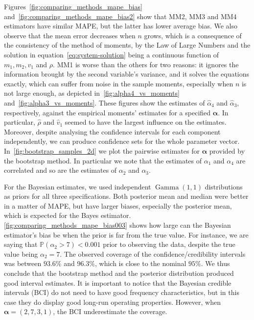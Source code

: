 \documentclass[a4paper, notitlepage, 10pt]{article}
\newcommand{\parameter}{\boldsymbol{\alpha}}
\newcommand{\pr}{\mathbb{P}}
\theoremstyle{definition}
\begin{document}
Figures~\ref{fig:comparing_methods_mape_bias} and~\ref{fig:comparing_methods_mape_bias2} show that MM2, MM3 and MM4 estimators have similar MAPE, but the latter has lower average bias.
We also observe that the mean error decreases when $n$ grows, which is a consequence of the consistency of the method of moments, by the Law of Large Numbers and the solution in equation~\eqref{eq:system-solution} being a continuous function of $m_1, m_2, v_1$ and $\rho$.
MM1 is worse than the others for two reasons: it ignores the information brought by the second variable's variance, and it solves the equations exactly, which can suffer from noise in the sample moments, especially when $n$ is not large enough, as depicted in~\autoref{fig:alpha4_vs_moments} and~\autoref{fig:alpha3_vs_moments}. 
These figures show the estimates of $\hat\alpha_4$ and $\hat\alpha_3$, respectively, against the empirical moments' estimates for a specified $\parameter$. 
In particular, $\hat{\rho}$ and $\hat{v}_1$ seemed to have the largest influence on the estimates.
Moreover, despite analysing the confidence intervals for each component independently, we can produce confidence sets for the whole parameter vector.
In~\autoref{fig:bootstrap_samples_2d} we plot the pairwise estimates for $\parameter$ provided by the bootstrap method.
In particular we note that the estimates of $\alpha_1$ and $\alpha_4$ are correlated and so are the estimates of $\alpha_2$ and $\alpha_3$.

For the Bayesian estimates, we used independent $\operatorname{Gamma}(1,1)$ distributions as priors for all three specifications.
Both posterior mean and median were better in a matter of MAPE, but have larger biases, especially the posterior mean, which is expected for the Bayes estimator.
\autoref{fig:comparing_methods_mape_bias003} shows how large can the Bayesian estimator's bias be when the prior is far from the true value. 
For instance, we are saying that $\pr(\alpha_2 > 7) < 0.001$ prior to observing the data, despite the true value being $\alpha_2 = 7$.
The observed coverage of the confidence/credibility intervals was between $93.6\%$ and $96.3\%$, which is close to the nominal $95\%$.
We thus conclude that the bootstrap method and the posterior distribution produced good interval estimates. 
It is important to notice that the Bayesian credible intervals (BCI) do not need to have good frequency characteristics, but in this case they do display good long-run operating properties.
However, when $\parameter = (2,7,3,1)$, the BCI underestimate the coverage. 
\end{document}
